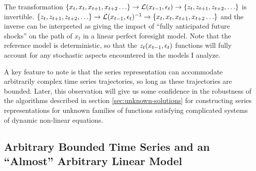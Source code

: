 \documentclass[12pt]{article}
\begin{document}



The
transformation $ {\{ x_{t}, x_{t}, x_{t+1},x_{t+2}\ldots\}} \rightarrow {\mathcal{L}}(x_{t-1},\epsilon_t) \rightarrow{\{ z_{t}, z_{t+1}, z_{t+2},\ldots\}} $ is invertible. $ {\{ z_{t}, z_{t+1}, z_{t+2},\ldots\}} \rightarrow {\mathcal{L}}(x_{t-1},\epsilon_t)^{-1} \rightarrow{\{ x_{t}, x_{t}, x_{t+1},x_{t+2}\ldots\}} $ and the inverse can be interpreted as giving the impact of ``fully anticipated future shocks'' on the path of $x_t$  in a linear perfect foresight model.  
Note that the reference model is deterministic, so that 
 the $z_t(x_{t-1},\epsilon_t)$ functions will 
fully account for any stochastic aspects encountered in the models I  analyze.

A key feature to note is that the series representation can accommodate arbitrarily complex time series trajectories, so long as these trajectories are bounded.
Later, this observation will give us some confidence in the 
robustness of the algorithms described in section 
\ref{sec:unknown-solutions} for constructing series 
representations for unknown families of functions 
satisfying complicated systems of dynamic non-linear equations.

\subsection{Arbitrary  Bounded Time Series and an ``Almost'' Arbitrary Linear Model }
\label{sec:almostarbitrary}
\end{document}
